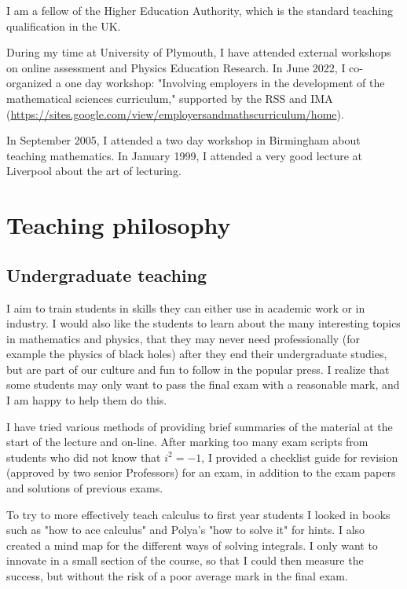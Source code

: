 \documentclass[12pt]{article}
\begin{document}
I am a fellow of the Higher Education Authority, which is the standard
teaching qualification in the UK.

During my time at University of Plymouth, I have attended external
workshops on online assessment and Physics Education Research.  In
June 2022, I co-organized a one day workshop: 
"Involving employers in the development of the mathematical sciences
curriculum," supported by the RSS and IMA (\url{https://sites.google.com/view/employersandmathscurriculum/home}).

 In
September 2005, I attended a two day workshop in Birmingham about
teaching mathematics. In January 1999, I attended a very good lecture
at Liverpool about the art of lecturing.


\section{Teaching philosophy} 

\subsection{Undergraduate teaching}

I aim to train students in skills they
can either use in academic work or in
industry. I would also like the students to
learn about the many interesting 
topics in mathematics and physics, that they may never 
need professionally (for example the physics of black holes)
after they end their undergraduate
studies, but are part of our culture and fun
to follow in the popular press.
I realize that some students may only want
to pass the final exam with a reasonable mark,
and I am happy to help them do this.

I have tried various methods of providing brief
summaries of the material at the start of the lecture
and on-line. After marking too many exam scripts from
students who did not know that $i^2 = -1$, I provided
a checklist guide for revision (approved by two senior
Professors) for an exam, 
in addition to the exam papers and solutions of previous exams.

To try to more effectively teach calculus to first year students I
looked in books such as "how to ace calculus" and Polya's "how to
solve it" for hints. I also created a mind map for the different ways
of solving integrals. I only want to innovate in a small section of
the course, so that I could then measure the success, but without the risk
of a poor average mark in the final exam.
\end{document}
